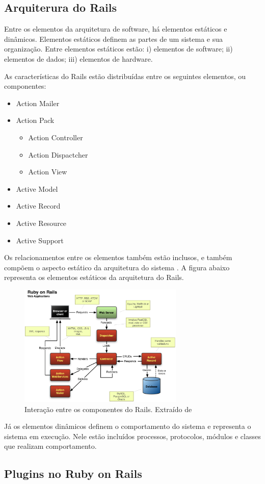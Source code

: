 
\subsection{Arquiterura do Rails}

Entre os elementos da arquitetura de software, há elementos estáticos e dinâmicos. Elementos estáticos definem as partes de um sistema e sua organização. Entre elementos estáticos estão: i) elementos de software; ii) elementos de dados; iii) elementos de hardware. 

As características do Rails estão distribuídas entre os seguintes elementos, ou componentes:

\begin{itemize}
\item Action Mailer
\item Action Pack
 \begin{itemize}
 \item Action Controller
 \item Action Dispactcher
 \item Action View
 \end{itemize}
\item Active Model
\item Active Record
\item Active Resource
\item Active Support
\end{itemize}

Os relacionamentos entre os elementos também estão inclusos, e também compõem o aspecto estático da arquitetura do sistema \cite{germoglio2010fundamentos}. A figura abaixo representa os elementos estáticos da arquitetura do Rails.

\graphicspath{{figuras/}}
\begin{figure}[H]
\centering
\includegraphics[width=0.7\textwidth]{rails-overview}
\caption{Interação entre os componentes do Rails. Extraído  de \cite{mejia2011rails}}
\label{rails-architecture}
\end{figure}

Já os elementos dinâmicos definem o comportamento do sistema e representa o sistema em execução. Nele estão incluídos processos, protocolos, módulos e classes que realizam comportamento.

\subsection{Plugins no Ruby on Rails}